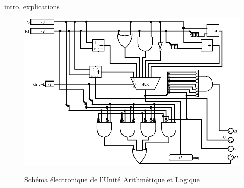 \paragraph{}{
	intro, explications
}

\begin{figure}
	\centering
	\includegraphics[scale=0.5,origin=c]{circuits/UAL.png}
	\label{ual_circ}
	\caption{Sch\'{e}ma \'{e}lectronique de l'Unit\'{e} Arithm\'{e}tique et Logique}
\end{figure}